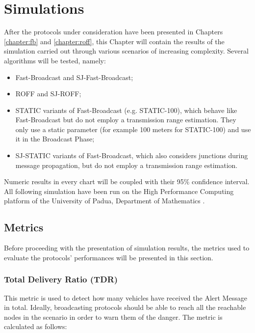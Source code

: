 

\chapter{Simulations}
	\label{chapter:simulations}
	After the protocols under consideration have been presented in Chapters \ref{chapter:fb} and \ref{chapter:roff}, this Chapter will contain the results of the simulation carried out through various scenarios of increasing complexity. Several algorithms will be tested, namely:
	\begin{itemize}
		\item Fast-Broadcast and SJ-Fast-Broadcast;
		\item ROFF and SJ-ROFF;
		\item STATIC variants of Fast-Broadcast (e.g. STATIC-100), which behave like Fast-Broadcast but do not employ a transmission range estimation. They only use a static parameter (for example 100 meters for STATIC-100) and use it in the Broadcast Phase;
		\item SJ-STATIC variants of Fast-Broadcast, which also considers junctions during message propagation, but do not employ a transmission range estimation.
	\end{itemize}
	
	
	Numeric results in every chart will be coupled with their 95\% confidence interval. All following simulation have been run on the High Performance Computing platform of the University of Padua, Department of Mathematics \cite{cluster}.
	
	\section{Metrics}
		\label{sec:metrics}
		Before proceeding with the presentation of simulation results, the metrics used to evaluate the protocols' performances will be presented in this section. 
		
		\subsection{Total Delivery Ratio (TDR)}
			\label{ssec:tdr}
			This metric is used to detect how many vehicles have received the Alert Message in total. Ideally, broadcasting protocols should be able to reach all the reachable nodes in the scenario in order to warn them of the danger. The metric is calculated as follows:
			
